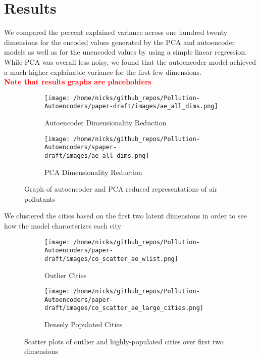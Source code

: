 \documentclass{article}
\newcommand\note[1]{\textbf{\textcolor{red}{#1}}}
\begin{document}
\section{Results}
We compared the percent explained variance across one hundred twenty dimensions for
the encoded values generated by the PCA and autoencoder models as well as for the unencoded
values by using a simple linear regression. While PCA was overall less noisy, we found that
the autoencoder model achieved a much higher explainable variance for the first few dimensions.
\\ \note{Note that results graphs are placeholders}
\begin{figure}[h!]

\begin{subfigure}{0.5\textwidth}
    \texttt{[image: /home/nicks/github\_repos/Pollution-Autoencoders/paper-draft/images/ae\_all\_dims.png]} 
    \caption{Autoencoder Dimensionality Reduction}
    \label{fig:ae_dim_reduction}
\end{subfigure}%
\begin{subfigure}{0.5\textwidth}
    \texttt{[image: /home/nicks/github\_repos/Pollution-Autoencoders/spaper-draft/images/ae\_all\_dims.png]}
    \caption{PCA Dimensionality Reduction}
    \label{fig:pca_dim_reduction}
\end{subfigure}

\caption{Graph of autoencoder and PCA reduced representations of air pollutants}
\label{fig:ae_vs_pca}
\end{figure}

\par We clustered the cities based on the first two latent dimensions in order to see how
the model characterizes each city

\begin{figure}[h!]

\begin{subfigure}{0.5\textwidth}
    \texttt{[image: /home/nicks/github\_repos/Pollution-Autoencoders/paper-draft/images/co\_scatter\_ae\_wlist.png]} 
    \caption{Outlier Cities}
    \label{fig:outliers}
\end{subfigure}%
\begin{subfigure}{0.5\textwidth}
    \texttt{[image: /home/nicks/github\_repos/Pollution-Autoencoders/paper-draft/images/co\_scatter\_ae\_large\_cities.png]}
    \caption{Densely Populated Cities}
    \label{fig:dense_cities}
\end{subfigure}

\caption{Scatter plots of outlier and highly-populated cities over first two dimensions}
\label{fig:outliers_vs_dense_cities}
\end{figure}
\end{document}
